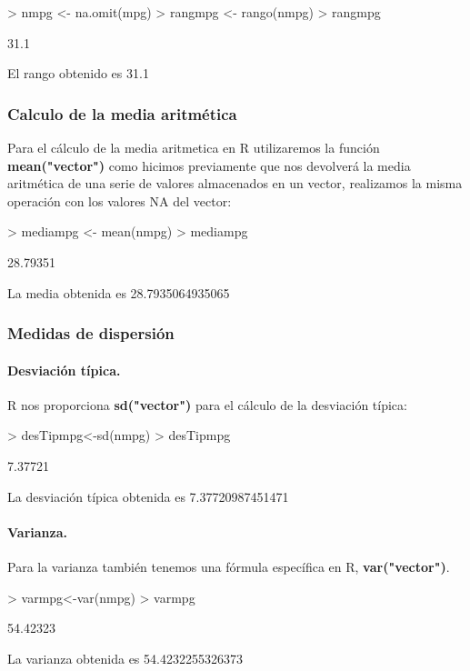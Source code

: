\documentclass [a4paper] {article}
\begin{document}
\begin{Schunk}
\begin{Sinput}
> nmpg <- na.omit(mpg)
> rangmpg <- rango(nmpg)
> rangmpg
\end{Sinput}
\begin{Soutput}
[1] 31.1
\end{Soutput}
\end{Schunk}

El rango obtenido es 31.1

\subsubsection{Calculo de la media aritmética}
Para el cálculo de la media aritmetica en R utilizaremos la función \textbf{mean("vector")} como hicimos previamente que nos devolverá la media aritmética de
una serie de valores almacenados en un vector, realizamos la misma operación con los valores NA del vector:
\begin{Schunk}
\begin{Sinput}
> mediampg <- mean(nmpg)
> mediampg
\end{Sinput}
\begin{Soutput}
[1] 28.79351
\end{Soutput}
\end{Schunk}

La media obtenida es 28.7935064935065


\subsubsection{Medidas de dispersión}
\paragraph{Desviación típica.}
R nos proporciona \textbf{sd("vector")} para el cálculo de la desviación típica:
\begin{Schunk}
\begin{Sinput}
> desTipmpg<-sd(nmpg)
> desTipmpg
\end{Sinput}
\begin{Soutput}
[1] 7.37721
\end{Soutput}
\end{Schunk}
La desviación típica obtenida es 7.37720987451471
\paragraph{Varianza.}
Para la varianza también tenemos una fórmula específica en R, \textbf{var("vector")}.
\begin{Schunk}
\begin{Sinput}
> varmpg<-var(nmpg)
> varmpg
\end{Sinput}
\begin{Soutput}
[1] 54.42323
\end{Soutput}
\end{Schunk}
La varianza obtenida es 54.4232255326373
\end{document}
